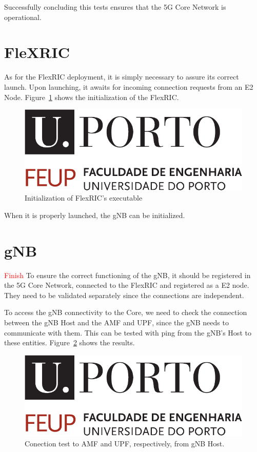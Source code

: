 Successfully concluding this tests ensures that the 5G Core Network is operational.

\section{FleXRIC}\label{sec:flexric}
As for the FlexRIC deployment, it is simply necessary to assure its correct launch.
Upon launching, it awaits for incoming connection requests from an E2 Node.
Figure~\ref{fig:near-rt-ric} shows the initialization of the FlexRIC\@.

\begin{figure}[H]
    \centering
    \includegraphics[width=0.5\linewidth]{figures/uporto-feup}
    \caption{Initialization of FlexRIC's executable}
    \label{fig:near-rt-ric}
\end{figure}

When it is properly launched, the gNB can be initialized.

\section{gNB}\label{sec:gnb}
\textcolor{red}{Finish}
To ensure the correct functioning of the gNB, it should be registered in the 5G Core Network, connected to the FlexRIC and registered as a E2 node.
They need to be validated separately since the connections are independent.

To access the gNB connectivity to the Core, we need to check the connection between the gNB Host and the AMF and UPF, since the gNB needs to communicate with them.
This can be tested with ping from the gNB's Host to these entities.
Figure~\ref{fig:ping_gnb} shows the results.


\begin{figure}[H]
    \centering
    \includegraphics[width=0.5\linewidth]{figures/uporto-feup}
    \caption{Conection test to AMF and UPF, respectively, from gNB Host.}
    \label{fig:ping_gnb}
\end{figure}

